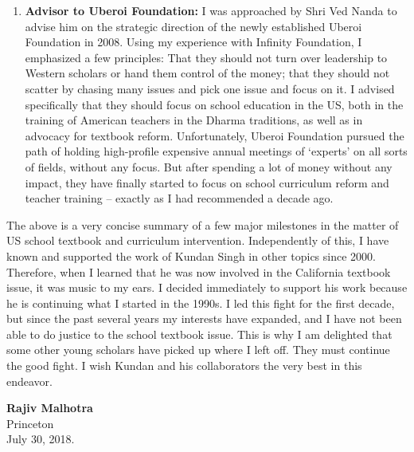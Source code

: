 \begin{enumerate}
\item \textbf{Advisor to Uberoi Foundation:} I was approached by Shri Ved Nanda to advise him on the strategic direction of the newly established Uberoi Foundation in 2008. Using my experience with Infinity Foundation, I emphasized a few principles: That they should not turn over leadership to Western scholars or hand them control of the money; that they should not scatter by chasing many issues and pick one issue and focus on it. I advised specifically that they should focus on school education in the US, both in the training of American teachers in the Dharma traditions, as well as in advocacy for textbook reform. Unfortunately, Uberoi Foundation pursued the path of holding high-profile expensive annual meetings of ‘experts’ on all sorts of fields, without any focus. But after spending a lot of money without any impact, they have finally started to focus on school curriculum reform and teacher training – exactly as I had recommended a decade ago.
\end{enumerate}

The above is a very concise summary of a few major milestones in the matter of US school textbook and curriculum intervention. Independently of this, I have known and supported the work of Kundan Singh in other topics since 2000. Therefore, when I learned that he was now involved in the California textbook issue, it was music to my ears. I decided immediately to support his work because he is continuing what I started in the 1990s. I led this fight for the first decade, but since the past several years my interests have expanded, and I have not been able to do justice to the school textbook issue. This is why I am delighted that some other young scholars have picked up where I left off. They must continue the good fight. I wish Kundan and his collaborators the very best in this endeavor. 
\bigskip

\noindent
\textbf{Rajiv Malhotra}\\
Princeton\\
July 30, 2018. 
